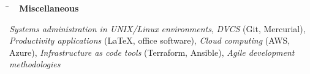 \documentclass[10pt]{article} %
\newlength{\smallertextwidth}
\newcommand{\sqbullet}{~\vrule height 1ex width .8ex depth -.2ex} %
\newcommand{\skillgroup}[2]{
\begin{tabbing}
\hspace{5mm} \= \kill
\sqbullet \>\+ \textbf{#1}\\
\begin{minipage}{\smallertextwidth}
\vspace{5pt}
#2
\end{minipage}
\end{tabbing}
}
\newcommand{\interestsgroup}[1]{
\begin{tabbing}%
\hspace{5mm}\=\kill%
#1%
\end{tabbing}
\vspace{-10mm}
}
\newcommand{\reference}[4]{
\parbox[t]{0.5\textwidth}{
\begin{tabbing}
\hspace{2cm} \= \hspace{4cm} \= \kill
\textbf{Name} \> #1\\
\textbf{Company} \> #2\\
\textbf{Position} \> #3\\
\textbf{Contact} \> \href{mailto:{#4}}{#4}
\end{tabbing}
}}
\begin{document}

\skillgroup{Miscellaneous}
{
\textit{Systems administration in UNIX/Linux environments},
\textit{DVCS} (Git, Mercurial), 
\textit{Productivity applications} (LaTeX, office software),
\textit{Cloud computing} (AWS, Azure),
\textit{Infrastructure as code tools} (Terraform, Ansible),
\textit{Agile development methodologies}
}





%
%

\end{document}

